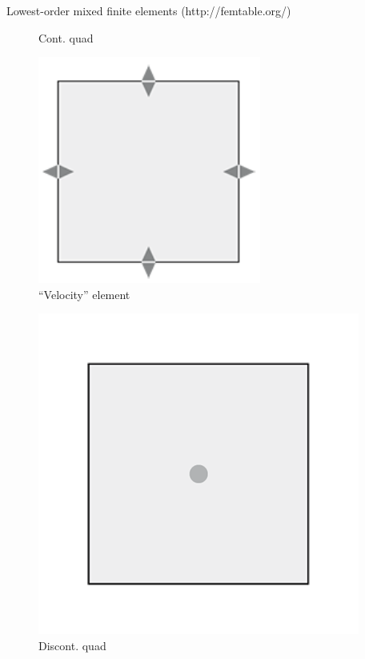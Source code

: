 \documentclass[9pt]{beamer}
\begin{document}
\begin{frame}[c]{Lowest-order mixed finite elements (http://femtable.org/)}
\begin{center}
\begin{minipage}{0.33\textwidth}
\begin{figure}
				\caption*{Cont. quad}
			\end{figure}
		\end{minipage}%
		\begin{minipage}{0.33\textwidth}
			\centering
			\begin{figure}
				\includegraphics[width=0.59\linewidth]{figures/rtcf1}
				\caption*{``Velocity'' element}
			\end{figure}
		\end{minipage}%
		\begin{minipage}{0.33\textwidth}
			\centering
			\begin{figure}
				\includegraphics[width=0.7\linewidth]{figures/dQ0_quadrilateral}
				\caption*{Discont. quad}
			\end{figure}
		\end{minipage}
	\end{center}%
	\begin{center}\vspace{-2.5mm}

\end{center}
\end{frame}
\end{document}
